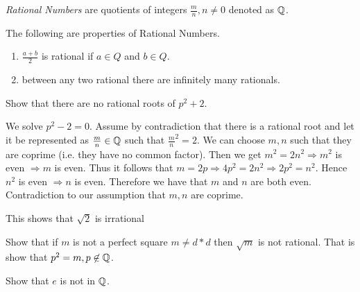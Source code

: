 \begin{definition}
	{\em Rational Numbers}  are quotients of integers \( \frac{m}{n}, n \not = 0 \) denoted as
	\( \mathbb{Q} \).
	\label{Rational}
\end{definition}

\begin{corollary}[Properties]
	The following are properties of Rational Numbers.
	\begin{enumerate}[]
		\item \( \frac{a+b}{2} \) is rational if \( a \in Q \) and \( b \in Q \).
		\item between any two rational there are infinitely many rationals. 
	\end{enumerate}
	\label{RationalProperties}
\end{corollary}

\begin{example}
	Show that there are no rational roots of \( p^2 + 2 \).
\end{example}

\begin{solution}
	We solve \( p^2 - 2 = 0 \). Assume by contradiction that there is a rational root and let it
	be represented as \( \frac{m}{n} \in \mathbb{Q} \) such that \( \frac{m}{n}^2 = 2 \). We can choose
	\( m,n \) such that they are coprime (i.e. they have no common factor).  Then we get 
	\( m^2 = 2n^2 \Rightarrow m^2 \) is even \( \Rightarrow m \) is even. Thus it follows that
	\( m = 2p \Rightarrow 4p^2 = 2n^2 \Rightarrow 2p^2 = n^2 \). Hence \( n^2 \) is even \(
	\Rightarrow n \) is even. Therefore we have that \( m \) and \( n \) are both even.
	Contradiction to our assumption that \( m,n \) are coprime.
\end{solution}

\begin{note}
	This shows that \( \sqrt{2} \) is irrational
\end{note}

\begin{exercise}
	Show that if \( m \) is not a perfect square \( m \not = d*d \) then \( \sqrt{m} \) is not
	rational. That is show that \( p^2 = m, p \not \in \mathbb{Q} \).
\end{exercise}

\begin{example}
	Show that \( e \) is not in \( \mathbb{Q} \).
\end{example}

